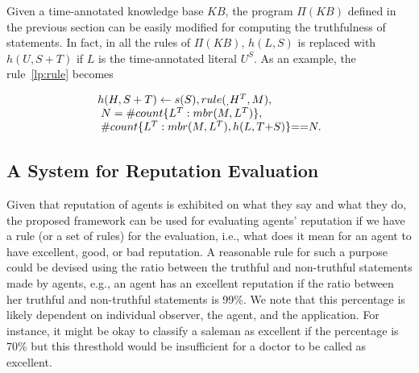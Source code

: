 \documentclass{article}
\begin{document}
Given a time-annotated knowledge base $KB$, the program $\Pi(KB)$ defined in the previous section can be easily modified for computing the truthfulness of statements. In fact, in all the rules of $\Pi(KB)$, $h(L, S)$ is replaced with $h(U, S+T)$ if $L$ is the time-annotated literal $U^S$. As an example, the rule~\eqref{lp:rule} becomes 

  \begin{equation}\label{lp:rule:tt}
\begin{array}{l}
h(H, S+T) \leftarrow  s(S),  
        rule(_, H^T, M),  \\ 
     \hspace{.1cm} N = \# count \{L^T : mbr(M, L^T)\},  \\ 
    \hspace{.1cm}  \# count \{L^T : mbr(M, L^T),  h(L, T{+}S) \} {==} N. 
      \end{array}
\end{equation} 


 

%

 
\subsection{A System for Reputation Evaluation}    
Given that reputation of agents is exhibited on what they say and what they do, the proposed framework can be used for evaluating agents' reputation if we have a rule (or a set of rules) for the evaluation, i.e., what does it mean for an agent to have excellent, good, or bad reputation. A reasonable rule for such a purpose could be devised using the ratio between the truthful and non-truthful statements made by agents, e.g., an agent has an excellent reputation if the ratio between her  truthful and non-truthful statements is 99\%. We note that this percentage is likely dependent on individual observer, the agent, and the application. For instance, it might be okay to classify a saleman as excellent if the percentage is 70\% but this thresthold would be insufficient for a doctor to be called as excellent. 
\end{document}
